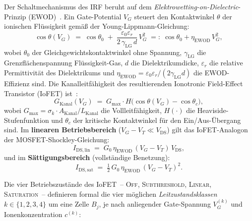 ﻿\documentclass[12pt, a4paper, openany]{report}
\begin{document}
Der Schaltmechanismus des IRF beruht auf dem
\emph{Elektrowetting-on-Dielectric}-Prinzip (EWOD)~\cite{epp2026iono}.
Ein Gate-Potential $V_G$ steuert den Kontaktwinkel $\theta$ der ionischen
Flüssigkeit gemäß der Young-Lippmann-Gleichung:
\begin{equation}
  \label{eq:iono_ewod}
  \cos\theta(V_G) \;=\; \cos\theta_0
  \;+\; \frac{\varepsilon_0 \varepsilon_r}{2\,\gamma_{\mathrm{LG}}\,d}\,V_G^2
  \;=:\; \cos\theta_0 + \eta_{\mathrm{EWOD}}\,V_G^2,
\end{equation}
wobei $\theta_0$ der Gleichgewichtskontaktwinkel ohne Spannung,
$\gamma_{\mathrm{LG}}$ die Grenzflächenspannung Flüssigkeit-Gas,
$d$ die Dielektrikumdicke, $\varepsilon_r$ die relative Permittivität des
Dielektrikums und $\eta_{\mathrm{EWOD}} = \varepsilon_0\varepsilon_r/(2\gamma_{\mathrm{LG}}d)$
die EWOD-Effizienz sind.  Die Kanalleitfähigkeit des resultierenden
Ionotronic Field-Effect Transistor (IoFET) ist~\cite{epp2026iono}:
\begin{equation}
  \label{eq:iono_gkanal}
  G_{\mathrm{Kanal}}(V_G)
  \;=\; G_{\max} \cdot H\!\bigl(\cos\theta(V_G) - \cos\theta_c\bigr),
\end{equation}
wobei $G_{\max} = \sigma_k \cdot A_{\mathrm{Kanal}} / L_{\mathrm{Kanal}}$
die Vollleitfähigkeit, $H(\cdot)$ die Heaviside-Stufenfunktion und
$\theta_c$ der kritische Kontaktwinkel für den Ein/Aus-Übergang sind.
Im \textbf{linearen Betriebsbereich} ($V_G - V_T \ll V_\mathrm{DS}$)
gilt das IoFET-Analogon der MOSFET-Shockley-Gleichung:
\begin{equation}
  \label{eq:iono_linear}
  I_\mathrm{DS,lin} \;=\; G_0\,\eta_{\mathrm{EWOD}}\,(V_G - V_T)\,V_\mathrm{DS},
\end{equation}
und im \textbf{Sättigungsbereich} (vollständige Benetzung):
\begin{equation}
  \label{eq:iono_sat}
  I_\mathrm{DS,sat} \;=\; \tfrac{1}{2}\,G_0\,\eta_{\mathrm{EWOD}}\,(V_G - V_T)^2.
\end{equation}

Die vier Betriebszustände des IoFET~-- \textsc{Off}, \textsc{Sub\-threshold},
\textsc{Linear}, \textsc{Saturation}~-- definieren formal die vier möglichen
\emph{Leitzustandsklassen} $k \in \{1,2,3,4\}$ um eine Zelle $B_j$, je nach
anliegender Gate-Spannung $V_G^{(k)}$ und Ionenkonzentration $c^{(k)}$:
\end{document}
